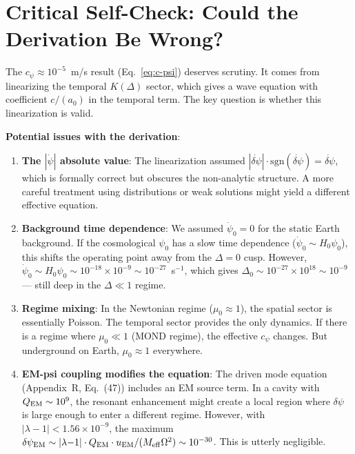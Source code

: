 \documentclass[11pt]{article}
\newcommand{\ee}[1]{\times 10^{#1}}
\newcommand{\lambdaone}{|\lambda{-}1|}
\begin{document}
\section{Critical Self-Check: Could the Derivation Be Wrong?}

The $c_\psi \approx 10^{-5}$~m/s result (Eq.~\ref{eq:c-psi}) deserves
scrutiny. It comes from linearizing the temporal $K(\Delta)$ sector,
which gives a wave equation with coefficient $c/(a_0)$ in the temporal
term. The key question is whether this linearization is valid.

\textbf{Potential issues with the derivation}:

\begin{enumerate}
\item \textbf{The $|\dot\psi|$ absolute value}: The linearization
  assumed $|\dot{\delta\psi}| \cdot \mathrm{sgn}(\dot{\delta\psi}) =
  \dot{\delta\psi}$, which is formally correct but obscures the
  non-analytic structure. A more careful treatment using distributions
  or weak solutions might yield a different effective equation.

\item \textbf{Background time dependence}: We assumed $\dot\psi_0 = 0$
  for the static Earth background. If the cosmological $\psi_0$ has a
  slow time dependence ($\dot\psi_0 \sim H_0 \psi_0$), this shifts the
  operating point away from the $\Delta = 0$ cusp. However,
  $\dot\psi_0 \sim H_0 \psi_0 \sim 10^{-18} \times 10^{-9} \sim
  10^{-27}$~s$^{-1}$, which gives $\Delta_0 \sim 10^{-27} \times
  10^{18} \sim 10^{-9}$ --- still deep in the $\Delta \ll 1$ regime.

\item \textbf{Regime mixing}: In the Newtonian regime ($\mu_0 \approx 1$),
  the spatial sector is essentially Poisson. The temporal sector provides
  the only dynamics. If there is a regime where $\mu_0 \ll 1$ (MOND regime),
  the effective $c_\psi$ changes. But underground on Earth, $\mu_0 \approx 1$
  everywhere.

\item \textbf{EM-psi coupling modifies the equation}: The driven mode
  equation (Appendix~R, Eq.~(47)) includes an EM source term. In a cavity
  with $Q_{\rm EM} \sim 10^9$, the resonant enhancement might create
  a local region where $\delta\psi$ is large enough to enter a different
  regime. However, with $\lambdaone < 1.56\ee{-9}$, the maximum
  $\delta\psi_{\rm EM} \sim \lambdaone \cdot Q_{\rm EM} \cdot u_{\rm EM}
  / (M_{\rm eff} \Omega^2) \sim 10^{-30}$. This is utterly negligible.
\end{enumerate}
\end{document}
